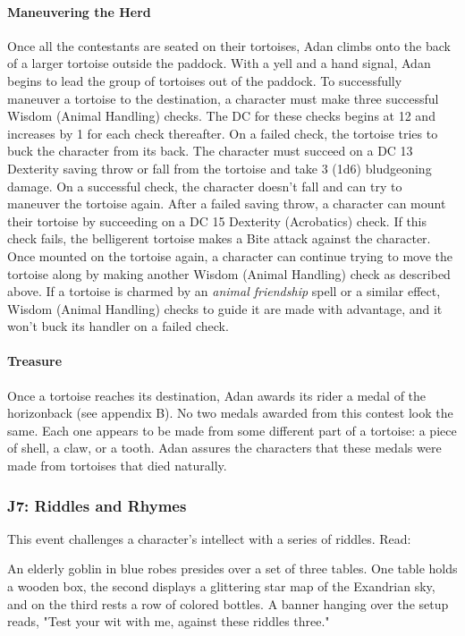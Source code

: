\documentclass[10pt,a4,twoside,twocolumn,openany,nodeprecatedcode]{dndbook}
\begin{document}
\paragraph{Maneuvering the Herd}
Once all the contestants are seated on their tortoises, Adan climbs onto the back of a larger tortoise outside the paddock. With a yell and a hand signal, Adan begins to lead the group of tortoises out of the paddock.
To successfully maneuver a tortoise to the destination, a character must make three successful Wisdom (Animal Handling) checks. The DC for these checks begins at 12 and increases by 1 for each check thereafter. On a failed check, the tortoise tries to buck the character from its back. The character must succeed on a DC 13 Dexterity saving throw or fall from the tortoise and take 3 (1d6) bludgeoning damage. On a successful check, the character doesn't fall and can try to maneuver the tortoise again.
After a failed saving throw, a character can mount their tortoise by succeeding on a DC 15 Dexterity (Acrobatics) check. If this check fails, the belligerent tortoise makes a Bite attack against the character. Once mounted on the tortoise again, a character can continue trying to move the tortoise along by making another Wisdom (Animal Handling) check as described above.
If a tortoise is charmed by an \textit{animal friendship} spell or a similar effect, Wisdom (Animal Handling) checks to guide it are made with advantage, and it won't buck its handler on a failed check.
\paragraph{Treasure}
Once a tortoise reaches its destination, Adan awards its rider a medal of the horizonback (see appendix B).
No two medals awarded from this contest look the same. Each one appears to be made from some different part of a tortoise: a piece of shell, a claw, or a tooth. Adan assures the characters that these medals were made from tortoises that died naturally.
\subsubsection{J7: Riddles and Rhymes}
This event challenges a character's intellect with a series of riddles. Read:
\begin{DndReadAloud}{}
An elderly goblin in blue robes presides over a set of three tables. One table holds a wooden box, the second displays a glittering star map of the Exandrian sky, and on the third rests a row of colored bottles. A banner hanging over the setup reads, "Test your wit with me, against these riddles three."
\end{DndReadAloud}
\end{document}
